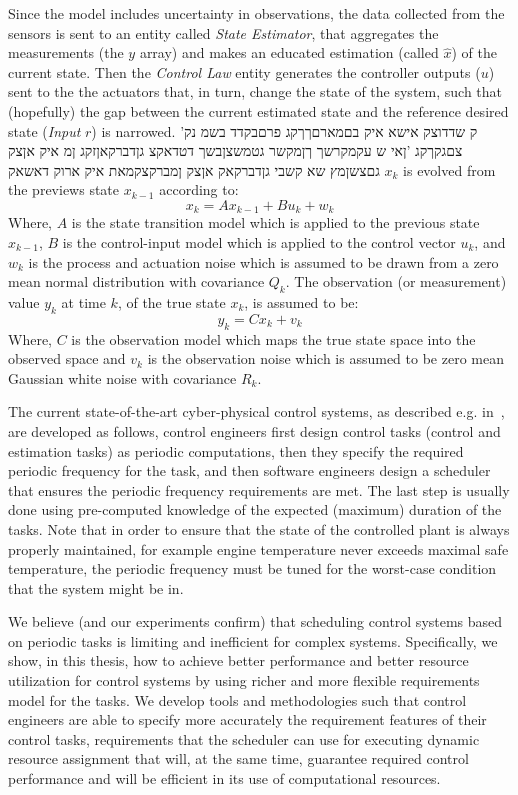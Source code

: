 \documentclass[ twoside, 12pt ]{article}
\begin{document}
Since the model includes uncertainty in observations, the data collected from the sensors is sent to an entity called \textit{State Estimator}, that aggregates the measurements (the $y$ array) and makes an educated estimation (called $\hat{x}$) of the current state. Then the \textit{Control Law} entity generates the controller outputs ($u$) sent to the the actuators that, in turn, change the state of the system, such that (hopefully) the gap between the current estimated state and the reference desired state (\textit{Input} $r$) is narrowed.
'ק שדדוצק אישא איק בםמארםךךקג פרםבקדד בשמ נק צםגקךקג 'ןאי ש עקמקרשך ךןמקשר גטמשצןבשך דטדאקצ גןדברקאןזקג ןמ איק אןצק גםצשןמץ שא קשבי גןדברקאק אןצק ןמברקצקמאת איק ארוק דאשאק $x_k$ is evolved from the previews state $x_{k-1}$ according to: $$ x_{k}=Ax_{k-1} + Bu_{k} + w_{k} $$ Where, $A$ is the state transition model which is applied to the previous state $x_{k-1}$, $B$ is the control-input model which is applied to the control vector $u_k$, and $w_k$ is the process and actuation noise which is assumed to be drawn from a zero mean normal distribution with covariance $Q_k$. The observation (or measurement) value $y_k$ at time $k$, of the true state $x_k$, is assumed to be: $$y_k=Cx_k+v_k$$ Where, $C$ is the observation model which maps the true state space into the observed space and $v_k$ is the observation noise which is assumed to be zero mean Gaussian white noise with covariance $R_k$.

The current state-of-the-art cyber-physical control systems, as described e.g. in~\cite{Cervin}, are developed as follows, control engineers first design control tasks (control and estimation tasks) as periodic computations, then they specify the required periodic frequency for the task, and then software engineers design a scheduler that ensures the periodic frequency requirements are met. The last step is usually done using pre-computed knowledge of the expected (maximum) duration of the tasks. Note that in order to ensure that the state of the controlled plant is always properly maintained, for example engine temperature never exceeds maximal safe temperature, the periodic frequency must be tuned for the worst-case condition that the system might be in.

We believe (and our experiments confirm) that scheduling control systems based on periodic tasks is limiting and inefficient for complex systems. Specifically, we show, in this thesis, how to achieve better performance and better resource utilization for control systems by using richer and more flexible requirements model for the tasks. We develop tools and methodologies such that control engineers are able to specify more accurately the requirement features of their control tasks, requirements that the scheduler can use for executing dynamic resource assignment that will, at the same time, guarantee required control performance and will be efficient in its use of computational resources.
\end{document}
